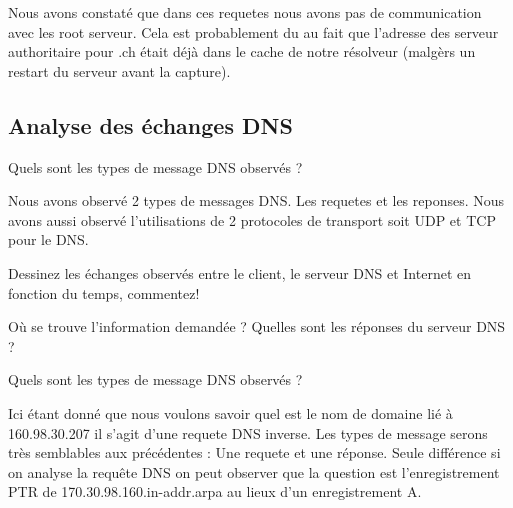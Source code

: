 \documentclass[a4paper, 12pt]{article}
\begin{document}
Nous avons constaté que dans ces requetes nous avons pas de communication avec les root serveur. Cela est probablement du au fait que l'adresse des serveur authoritaire pour .ch était déjà dans le cache de notre résolveur (malgèrs un restart du serveur avant la capture).

\subsection{Analyse des échanges DNS}
\begin{question}[resume]
\item Quels sont les types de message DNS observés ?
\end{question}

Nous avons observé 2 types de messages DNS. Les requetes et les reponses. Nous avons aussi observé l'utilisations de 2 protocoles de transport soit UDP et TCP pour le DNS.



\begin{question}[resume]
\item Dessinez les échanges observés entre le client, le serveur DNS et Internet en fonction du temps, commentez!
\end{question}


\begin{question}[resume]
\item Où se trouve l'information demandée ? Quelles sont les réponses du serveur DNS ?
\end{question}


\begin{question}[resume]
\item Quels sont les types de message DNS observés ?
\end{question}

Ici étant donné que nous voulons savoir quel est le nom de domaine lié à 160.98.30.207 il s'agit d'une requete DNS inverse. Les types de message serons très semblables aux précédentes : Une requete et une réponse. Seule différence si on analyse la requête DNS on peut observer que la question est l'enregistrement PTR de 170.30.98.160.in-addr.arpa au lieux d'un enregistrement A.
\end{document}
